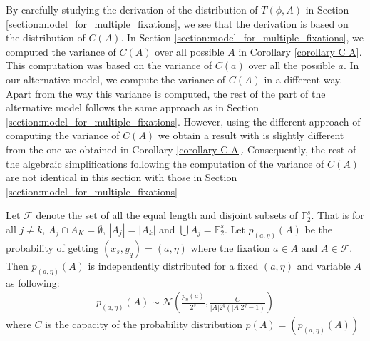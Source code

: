 \iffalse
By carefully studying the derivation of the distribution of $T\left(\phi,A\right)$ in Section \ref{section:model_for_multiple_fixations}, we see that the derivation is based on the distribution of $C(A)$. In Section \ref{section:model_for_multiple_fixations}, we computed the variance of $C\left(A\right)$ over all possible $A$ in Corollary \ref{corollary C A}. This computation was based on the variance of $C\left(a\right)$ over all the possible $a$. In our alternative model, we compute the variance of $C\left(A\right)$ in a different way. Apart from the way this variance is computed, the rest of the part of the alternative model follows the same approach as in Section \ref{section:model_for_multiple_fixations}. However, using the different approach of computing the variance of $C\left(A\right)$ we obtain a result with is slightly different from the one we obtained in Corollary \ref{corollary C A}. Consequently, the rest of the algebraic simplifications following the computation of the variance of $C\left(A\right)$  are not identical in this section with those in Section \ref{section:model_for_multiple_fixations}
\begin{corollary} Let $\mathcal{F}$ denote the set of all the equal length and disjoint subsets of $\mathbb{F}_{2}^{s}$. That is for all $j \neq k$, $A_j \cap A_K = \emptyset$, $|A_j| = |A_k|$ and $\bigcup A_j = \mathbb{F}_{2}^{s}$. Let $p_{\left(a,\eta\right)}(A)$ be the probability of getting $(x_s,y_q) = (a,\eta)$ where the fixation $a \in A$ and $A \in \mathcal{F}$. Then $p_{\left(a,\eta\right)}(A)$ is independently distributed for a fixed $\left( a,\eta \right)$ and variable $A$ as following:
\begin{eqnarray*}
p_{\left( a,\eta\right)}(A) \sim \mathcal{N}\left(\frac{p_{\eta}(a)}{2^s},\frac{C}{|A|2^q(|A|2^q-1)}\right)
\end{eqnarray*}where $C$ is the capacity of the probability distribution $p\left(A\right) = \left( p_{\left(a,\eta\right)}\left(A\right) \right)$
\end{corollary}

